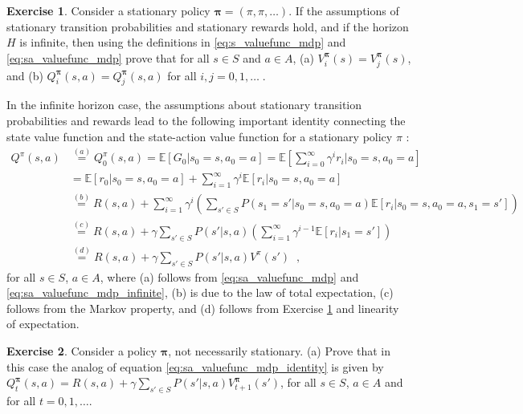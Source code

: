 \documentclass{article}
\theoremstyle{definition}
\newtheorem{exercise}{Exercise}[section]
\theoremstyle{remark}
\newcommand{\E}{\mathbb{E}}                                        %
\begin{document}
\begin{exercise}
Consider a stationary policy $\bm{\pi} = (\pi,\pi,\dots)$. If the assumptions of stationary transition probabilities and stationary rewards hold, and if the horizon $H$ is infinite, then using the definitions in \eqref{eq:s_valuefunc_mdp} and \eqref{eq:sa_valuefunc_mdp} prove that for all $s \in S$ and $a \in A$, (a) $V^{\bm{\pi}}_i(s) = V^{\bm{\pi}}_j(s)$, and (b) $Q^{\bm{\pi}}_i(s,a) = Q^{\bm{\pi}}_j(s,a)$ for all $i,j = 0,1,\dots \;$.
\label{ex-infinite-horizon-value-mdp}
\end{exercise}

In the infinite horizon case, the assumptions about stationary transition probabilities and rewards lead to the following important identity connecting the state value function and the state-action value function for a stationary policy $\pi$ :
\begin{equation}
\begin{split}
Q^{\pi}(s,a) &\stackrel{(a)}{=} Q^{\pi}_0(s,a) = \E[G_0|s_0 = s, a_0 = a] = \E \left[\sum_{i=0}^{\infty}\gamma^{i} r_i \bigg|s_0 = s, a_0 = a \right] \\
&= \E [r_0 | s_0 = s, a_0 = a] + \sum_{i=1}^{\infty}\gamma^{i} \E [r_i|s_0 = s, a_0 = a] \\
&\stackrel{(b)}{=} R(s,a) + \sum_{i=1}^{\infty}\gamma^{i} \left( \sum_{s' \in S}P(s_1 = s' | s_0 = s, a_0 = a) \E [r_i|s_0 = s, a_0 = a, s_1 = s'] \right) \\
&\stackrel{(c)}{=} R(s,a) + \gamma \sum_{s' \in S}P(s'|s,a) \left( \sum_{i=1}^{\infty}\gamma^{i-1} \E [r_i|s_1 = s'] \right)\\
&\stackrel{(d)}{=} R(s,a) + \gamma \sum_{s' \in S}P(s'|s,a)V^{\pi}(s') \;\;,
\end{split}
\label{eq:sa_valuefunc_mdp_identity}
\end{equation}
for all $s \in S$, $a \in A$, where (a) follows from \eqref{eq:sa_valuefunc_mdp} and \eqref{eq:sa_valuefunc_mdp_infinite}, (b) is due to the law of total expectation, (c) follows from the Markov property, and (d) follows from Exercise \ref{ex-infinite-horizon-value-mdp} and linearity of expectation.

\begin{exercise}
Consider a policy $\bm{\pi}$, not necessarily stationary. (a) Prove that in this case the analog of equation \eqref{eq:sa_valuefunc_mdp_identity} is given by $Q^{\bm{\pi}}_t(s,a) = R(s,a) + \gamma \sum_{s' \in S}P(s'|s,a)V^{\bm{\pi}}_{t+1}(s')$, for all $s \in S$, $a \in A$ and for all $t = 0,1,\dots$.
\label{ex-sa_valuefunc_mdp_identity_nonstationary}
\end{exercise}
\end{document}
